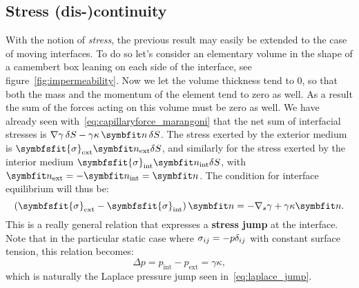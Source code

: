 \subsection{Stress (dis-)continuity}
With the notion of \textit{stress}, the previous result may easily be extended to the case of moving interfaces. To do so let's consider an elementary volume in the shape of a camembert box leaning on each side of the interface, see figure~\ref{fig:impermeability}. Now we let the volume thickness tend to 0, so that both the mass and the momentum of the element tend to zero as well. As a result the sum of the forces acting on this volume must be zero as well. We have already seen with~\eqref{eq:capillaryforce_marangoni} that the net sum of interfacial stresses is $\nabla \gamma \, \delta S -\gamma \kappa \, \bn \, \delta S$. The stress exerted by the exterior medium is $\symbfsfit{\sigma}_\text{ext} \bn_\text{ext} \delta S$, and similarly for the stress exerted by the interior medium $\symbfsfit{\sigma}_\text{int} \bn_\text{int} \delta S$, with $\bn_\text{ext} = - \bn_\text{int} = \bn$. The condition for interface equilibrium will thus be:
\begin{equation}
\lp\symbfsfit{\sigma}_\text{ext} - \symbfsfit{\sigma}_\text{int}\rp \bn = - \nabla_s \gamma + \gamma \kappa \bn.
\label{eq:dynamic_BC}
\end{equation}
This is a really general relation that expresses a \textbf{stress jump} at the interface. Note that in  the particular static case where $\sigma_{ij} = -p \delta_{ij}$ with constant surface tension, this relation becomes:
\begin{equation}
\Delta p = p_\text{int} - p_\text{ext} = \gamma \kappa,
\end{equation}
which is naturally the Laplace pressure jump seen in~\eqref{eq:laplace_jump}.

